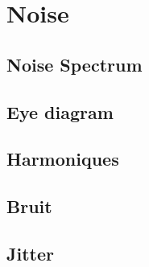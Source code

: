 
\section{Noise}
\subsection{Noise Spectrum}

\subsection{Eye diagram}
\subsection{Harmoniques}
\subsection{Bruit}
\subsection{Jitter}
